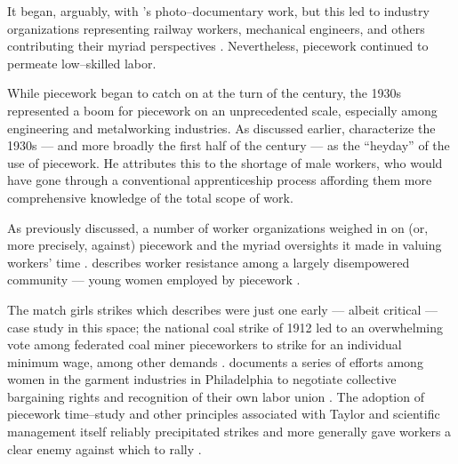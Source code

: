 \documentclass[trackingWork]{subfiles}
\begin{document}
It began, arguably, with \citeauthor{riisOtherSideLives}'s photo--documentary work,
but this led to industry organizations representing
railway workers, mechanical engineers, and others contributing their myriad perspectives
\cite{american1921problem,richards1904anything,riisOtherSideLives}.
Nevertheless, piecework continued to permeate low--skilled labor.

While piecework began to catch on at the turn of the  century,
the 1930s represented a boom for piecework on an unprecedented scale,
especially among engineering and metalworking industries.
As discussed earlier, \citeauthor{hart2013rise} characterize the 1930s
--- and more broadly the first half of the  century ---
as the ``heyday'' of the use of piecework.
He attributes this to the shortage of male workers,
who would have gone through a conventional apprenticeship process
affording them more comprehensive knowledge of the total scope of work.


As previously discussed, a number of worker organizations weighed in on
(or, more precisely, against) piecework and the myriad oversights it made in valuing workers' time
\cite{american1921problem,richards1904anything}.
\citeauthor{10.2307/3827491} describes worker resistance among a largely disempowered community --- young women employed by piecework
\cite{10.2307/3827491}.

The match girls strikes which \citeauthor{10.2307/3827491} describes were just one early
--- albeit critical ---
case study in this space;
the national coal strike of 1912 led to an overwhelming vote among federated coal miner pieceworkers
to strike for
an individual minimum wage, among other demands
\cite{10.2307/2221944}.
\citeauthor{10.2307/41829256} documents a series of efforts among women in the garment industries in Philadelphia to negotiate collective bargaining rights and recognition of their own labor union
\cite{10.2307/41829256}.
The adoption of piecework time--study and other principles associated with Taylor and scientific management
itself reliably precipitated strikes and more generally gave workers a clear enemy
against which to rally
\cite{jacoby1983union}.
\end{document}
